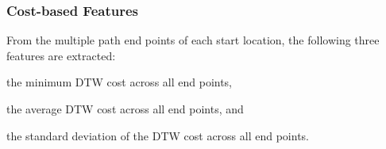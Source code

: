 \documentclass{article}
\begin{document}

\subsubsection{Cost-based Features}
From the multiple path end points of each start location, the following three features are extracted: 
\begin{inparaenum}[(i)]
    \item   the minimum DTW cost across all end points,
    \item   the average DTW cost across all end points, and
    \item   the standard deviation of the DTW cost across all end points.
\end{inparaenum}
\end{document}
